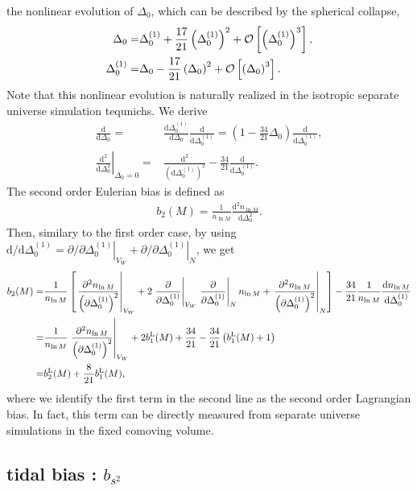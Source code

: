 \documentclass[a4paper,11pt]{article}
\renewcommand{\d}{\mathrm{d}}
\begin{document}
the nonlinear evolution of $\Delta_0$,
which can be described by the spherical collapse,
\begin{align}
\Delta_0 =& \Delta_0^{(1)} + \frac{17}{21}\left(\Delta_0^{(1)}\right)^2 + {\cal O}\left[
\left(\Delta^{(1)}_0\right)^3\right],
\\
\Delta_0^{(1)} =& \Delta_0 - \frac{17}{21}\left(\Delta_0\right)^2 
+ {\cal O}\left[ \left(\Delta_0\right)^3\right].
\end{align}
Note that this nonlinear evolution is naturally realized in the isotropic separate universe simulation tequnichs.
We derive 
\begin{align}
\frac{\d}{\d \Delta_0} 
=&
\frac{\d \Delta_0^{(1)} }{\d \Delta_0}\frac{\d }{\d \Delta_0^{(1)}}
=\left( 1 - \frac{34}{21}\Delta_0 \right)\frac{\d }{\d \Delta_0^{(1)}},
\\
\left. \frac{\d^2}{\d \Delta_0^2}\right|_{\Delta_0=0}
=& \frac{\d^2}{\left(\d \Delta_0^{(1)}\right)^2}
-\frac{34}{21}\frac{\d }{\d \Delta_0^{(1)}}.
\end{align}
The second order Eulerian bias is defined as
\begin{align}
b_2(M) = \frac{1}{n_{\ln{M}}}\frac{\d^2 n_{\ln{M}}}{\d \Delta_0^2}.
\end{align}
Then, similary to the first order case, by using
$\d/\d\Delta_0^{(1)}=
\left.\partial/\partial\Delta_0^{(1)}\right|_{V_W} 
+\left.\partial/\partial\Delta_0^{(1)}\right|_{N}$, 
we get
\begin{align}
b_2(M)
=&\frac{1}{n_{\ln{M}}}
\left[ \left.\frac{\partial^2 n_{\ln{M}} }{\left(\partial \Delta_0^{(1)}\right)^2}\right|_{V_W} 
+ 2 \left.\frac{\partial}{\partial \Delta_0^{(1)}}\right|_{V_W}
\left.\frac{\partial}{\partial \Delta_0^{(1)}}\right|_{N}n_{\ln{M}}
+ \left.\frac{\partial^2 n_{\ln{M}}  }{\left(\partial \Delta_0^{(1)}\right)^2}\right|_{N} \right]
-\frac{34}{21}
\frac{1}{n_{\ln{M}}}
\frac{\d n_{\ln{M}}}{\d \Delta_0^{(1)} }
\nonumber\\
=&\frac{1}{n_{\ln{M}}}\left.\frac{\partial^2 n_{\ln{M}} }{\left(\partial \Delta_0^{(1)}\right)^2}\right|_{V_W} 
+2b_1^{\rm L}(M) + \frac{34}{21} 
- \frac{34}{21}\left( b_1^{\rm L}(M) + 1 \right)
\nonumber\\
=&b_2^{\rm L}(M) + \frac{8}{21}b_1^{\rm L}(M),
\end{align}
where we identify the first term in the second line as the second order Lagrangian bias.
In fact, this term can be directly measured from separate universe simulations in the fixed comoving volume.

\subsection{tidal bias : $b_{s^2}$}
\end{document}
